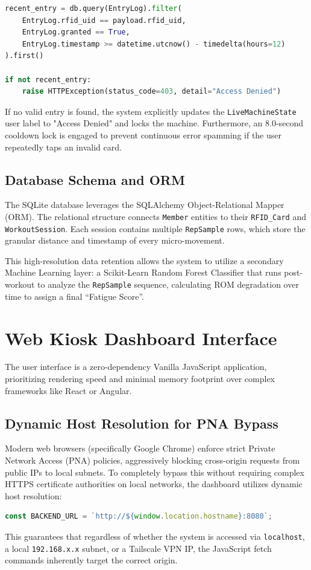 \documentclass[conference]{IEEEtran}
\begin{document}
\begin{lstlisting}[language=Python]
recent_entry = db.query(EntryLog).filter(
    EntryLog.rfid_uid == payload.rfid_uid,
    EntryLog.granted == True,
    EntryLog.timestamp >= datetime.utcnow() - timedelta(hours=12)
).first()

if not recent_entry:
    raise HTTPException(status_code=403, detail="Access Denied")
\end{lstlisting}

If no valid entry is found, the system explicitly updates the \texttt{LiveMachineState} user label to "Access Denied" and locks the machine. Furthermore, an 8.0-second cooldown lock is engaged to prevent continuous error spamming if the user repeatedly taps an invalid card.

\subsection{Database Schema and ORM}
The SQLite database leverages the SQLAlchemy Object-Relational Mapper (ORM). The relational structure connects \texttt{Member} entities to their \texttt{RFID\_Card} and \texttt{WorkoutSession}. Each session contains multiple \texttt{RepSample} rows, which store the granular distance and timestamp of every micro-movement.

This high-resolution data retention allows the system to utilize a secondary Machine Learning layer: a Scikit-Learn Random Forest Classifier that runs post-workout to analyze the \texttt{RepSample} sequence, calculating ROM degradation over time to assign a final ``Fatigue Score''.

\section{Web Kiosk Dashboard Interface}
The user interface is a zero-dependency Vanilla JavaScript application, prioritizing rendering speed and minimal memory footprint over complex frameworks like React or Angular.

\subsection{Dynamic Host Resolution for PNA Bypass}
Modern web browsers (specifically Google Chrome) enforce strict Private Network Access (PNA) policies, aggressively blocking cross-origin requests from public IPs to local subnets. To completely bypass this without requiring complex HTTPS certificate authorities on local networks, the dashboard utilizes dynamic host resolution:
\begin{lstlisting}[language=JavaScript]
const BACKEND_URL = `http://${window.location.hostname}:8080`;
\end{lstlisting}
This guarantees that regardless of whether the system is accessed via \texttt{localhost}, a local \texttt{192.168.x.x} subnet, or a Tailscale VPN IP, the JavaScript fetch commands inherently target the correct origin.
\end{document}
